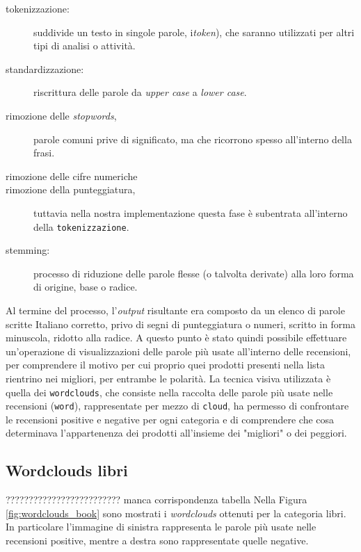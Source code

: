 		\begin{description}
			\item[tokenizzazione:] suddivide un testo in singole parole, i\textit{token}), che saranno utilizzati per altri tipi di analisi o attività.
			\item[standardizzazione:] riscrittura delle parole da \textit{upper case} a \textit{lower case}. 
			\item[rimozione delle \textit{stopwords},] parole comuni prive di significato, ma che ricorrono spesso all'interno della frasi.
			\item[rimozione delle cifre numeriche]
			\item[rimozione della punteggiatura,] tuttavia nella nostra implementazione questa fase è subentrata all'interno della \verb|tokenizzazione|. 
			\item [stemming:] processo di riduzione delle parole flesse (o talvolta derivate) alla loro forma di origine, base o radice.
		\end{description}
			
		Al termine del processo, l'\textit{output} risultante era composto da un elenco di parole scritte Italiano corretto, privo di segni di punteggiatura o numeri, scritto in forma minuscola, ridotto alla radice. A questo punto è stato quindi possibile effettuare un'operazione di visualizzazioni delle parole più usate all'interno delle recensioni, per comprendere il motivo per cui proprio quei prodotti presenti nella lista rientrino nei migliori, per entrambe le polarità. La tecnica visiva utilizzata è quella dei \verb|wordclouds|, che consiste nella raccolta delle parole più usate nelle recensioni (\verb|word|), rappresentate per mezzo di \verb|cloud|, ha permesso di confrontare le recensioni positive e negative per ogni categoria e di comprendere che cosa determinava l'appartenenza dei prodotti all'insieme dei "migliori" o dei peggiori. 
		
		\subsection{Wordclouds libri} ????????????????????????? manca corrispondenza tabella
			Nella Figura \ref{fig:wordclouds_book} sono mostrati i \textit{wordclouds} ottenuti per la categoria libri. In particolare l'immagine di sinistra rappresenta le parole più usate nelle recensioni positive, mentre a destra sono rappresentate quelle negative. 
			
